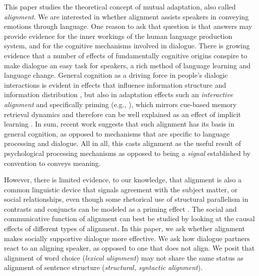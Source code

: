 This paper studies the theoretical concept of mutual adaptation, also called \emph{alignment}.
We are interested in whether alignment assists speakers in conveying emotions through language.  One reason to ask that question is that answers may provide evidence for the inner workings of the human language production system, and for the cognitive mechanisms involved in dialogue.   There is growing evidence that a number of effects of fundamentally cognitive origins conspire to make dialogue an easy task for speakers, a rich method of language learning and language change.  General cognition as a driving force in people's dialogic interactions is evident in effects that influence information structure and information distribution \parencite{jaeger2006speakers,xu_information_2018}, but also in adaptation effects such an \emph{interactive alignment} \parencite{pickering2004toward} and specifically priming (e.g., \cite{branigan2000syntactic}), which mirrors cue-based memory retrieval dynamics and therefore can be well explained as an effect of implicit learning \parencite{chang2006becoming,kaschak2011implicit,reitter_computational_2011}.
In sum, recent work suggests that such alignment has its basis in general cognition, as opposed to mechanisms that are specific to language processing and dialogue.  All in all, this casts alignment as the useful result of psychological processing mechanisms as opposed to being a \emph{signal} established by convention to conveys meaning.


However, there is limited evidence, to our knowledge, that alignment is also a common linguistic device that signals agreement with the subject matter, or social relationships, even though some rhetorical use of structural parallelism in contrasts and conjuncts \parencite{aristotle2015rhetoric} can be modeled as a priming effect \parencite{dubey2008probabilistic}.  The social and communicative function of alignment can best be studied by looking at the causal effects of different types of alignment.  In this paper, we ask whether alignment makes socially supportive dialogue more effective.  We ask how dialogue partners react to an aligning speaker, as opposed to one that does not align.  We posit that alignment of word choice (\emph{lexical alignment}) may not share the same status as alignment of sentence structure (\emph{structural, syntactic alignment}).

